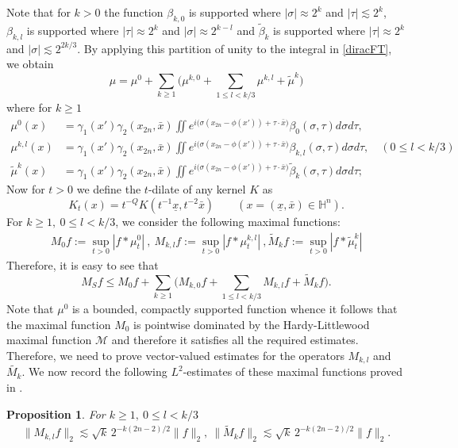 \documentclass[11pt]{amsart}
\newcommand{\Ha}{\mathbb{H}^n}
\newtheorem{prop}[theorem]{Proposition}
\theoremstyle{definition}
\numberwithin{equation}{section}
\begin{document}
Note that  for $k>0$ the function $\beta_{k,0} $ is supported
where $|\sigma| \approx 2^k$ and $|\tau|\lesssim 2^k$,
$\beta_{k,l} $ is supported
where $|\tau|\approx 2^k$ and $|\sigma|\approx 2^{k-l}$ and
$\widetilde \beta_k$ is supported where
$|\tau|\approx 2^k$ and $|\sigma|\lesssim  2^{2k/3}$. By applying this partition of unity to the integral in \eqref{diracFT}, we obtain 
$$\mu=
\mu^0+\sum_{k\ge 1}\big(\mu^{k,0}+\sum_{1\le l<k/3} \mu^{k,l}
+ \widetilde \mu^{k}\big)$$
where for $k\geq 1$ 
\begin{align*}
\mu^{0}(x)&= \gamma_1(x') \gamma_2(x_{2n}, \bar{x})
\iint 
e^{i\big(\sigma(x_{2n}-\phi(x'))+\tau \cdot \bar{x}\big)}  
\beta_0(\sigma,\tau)d\sigma d\tau,
\\
\mu^{k,l}(x)
&= \gamma_1(x') \gamma_2(x_{2n}, \bar{x})
\iint e^{i\big(\sigma(x_{2n}-\phi(x'))+\tau \cdot \bar{x}\big)} 
\beta_{k,l}(\sigma,\tau)d\sigma d\tau,\quad (0\le l<k/3)
\\
\widetilde \mu^{k}(x)&= \gamma_1(x') \gamma_2(x_{2n}, \bar{x}) \iint
e^{i\big(\sigma(x_{2n}-\phi(x'))+\tau \cdot \bar{x}\big)}   
\widetilde \beta_k(\sigma,\tau)d\sigma d\tau;
\end{align*}
Now  for $t>0$ we define the  $t$-dilate of any kernel $K$ as $$K_t(x)=t^{-Q} K(t^{-1}\underline{x}, t^{-2} \bar{x})\quad\quad (x=(\underline{x}, \bar{x})\in \Ha).$$ For $k\geq1,~ 0\leq l<k/3$, we consider the following maximal functions: 
\begin{align*}
    M_0f:=\sup_{t>0} |f* \mu^0_{t}|~,~ M_{k,l}f:=\sup_{t>0} |f* \mu^{k,l}_{t}|~, \widetilde{M}_{k}f:=\sup_{t>0}|f\ast \widetilde \mu^{k}_t|
\end{align*}
Therefore, it is easy to see that 
\begin{equation}
    \label{decomposeM}
    M_Sf\leq M_0f+\sum_{k\ge 1}\big(M_{k,0}f+\sum_{1\le l<k/3} M_{k,l}f
+ \widetilde M_kf\big).
\end{equation}
Note that $\mu^0$ is a bounded, compactly supported function whence it follows that 
the maximal function $M_{0}$ is pointwise dominated by the Hardy-Littlewood maximal function $\mathcal{M}$ and therefore it satisfies all the required estimates. Therefore, we need to prove vector-valued estimates for the operators $M_{k, l}$ and $\widetilde{M_{k}}$. We now record the following $L^2$-estimates of these maximal functions proved in \cite[Proposition 2.1]{MS}.
\begin{prop}
\label{PropMS}
 For $k\geq 1,~0\le l<k/3$ 
 \begin{align}
     \big\|M_{k,l}f\big\|_2\lesssim \sqrt{k}\, 2^{-k(2n-2)/2}\|f\|_2,~
\big\|\widetilde M_{k}f\big\|_2 
\lesssim \sqrt{k}\, 2^{-k(2n-2)/2} \|f\|_2.
 \end{align}  
\end{prop}
\end{document}
